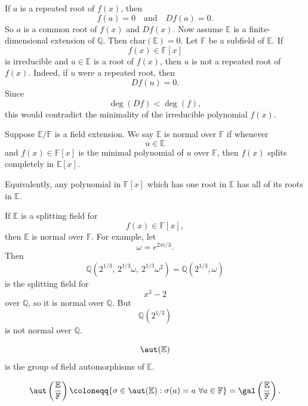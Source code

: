 If $a$ is a repeated root of $f(x)$, then
\[
    f(a)=0
    \quad\text{and}\quad
    Df(a)=0.
\]
So $a$ is a common root of $f(x)$ and $Df(x)$.
Now assume $\mathbb{E}$ is a finite-dimensional extension of $\mathbb{Q}$.
Then $\mathrm{char}(\mathbb{E})=0$.
Let $\mathbb{F}$ be a subfield of $\mathbb{E}$.
If
\[
    f(x)\in \mathbb{F}[x]
\]
is irreducible and $u\in \mathbb{E}$ is a root of $f(x)$, then $u$ is not a repeated root of $f(x)$.
Indeed, if $u$ were a repeated root, then
\[
    Df(u)=0.
\]
Since
\[
    \deg(Df)<\deg(f),
\]
this would contradict the minimality of the irreducible polynomial $f(x)$.

\begin{definition}
    Suppose $\mathbb{E}/\mathbb{F}$ is a field extension.
    We say $\mathbb{E}$ is normal over $\mathbb{F}$ if whenever
    \[
        u\in \mathbb{E}
    \]
    and $f(x)\in \mathbb{F}[x]$ is the minimal polynomial of $u$ over $\mathbb{F}$, then $f(x)$ splits completely in $\mathbb{E}[x]$.
\end{definition}

Equivalently, any polynomial in $\mathbb{F}[x]$ which has one root in $\mathbb{E}$ has all of its roots in $\mathbb{E}$.

\begin{example}
    If $\mathbb{E}$ is a splitting field for
    \[
        f(x)\in \mathbb{F}[x],
    \]
    then $\mathbb{E}$ is normal over $\mathbb{F}$.
    For example, let
    \[
        \omega=e^{2\pi i/3}.
    \]
    Then
    \[
        \mathbb{Q}\left(2^{1/3},\,2^{1/3}\omega,\,2^{1/3}\omega^2\right)
        =
        \mathbb{Q}\left(2^{1/3},\omega\right)
    \]
    is the splitting field for
    \[
        x^3-2
    \]
    over $\mathbb{Q}$, so it is normal over $\mathbb{Q}$.
    But
    \[
        \mathbb{Q}\left(2^{1/3}\right)
    \]
    is not normal over $\mathbb{Q}$.
\end{example}

\begin{definition}[Automorphism]
    \[
        \aut(\mathbb{E})
    \]
    is the group of field automorphisms of $\mathbb{E}$.
\end{definition}

\begin{definition}
    \[
        \aut\left(\frac{\mathbb{E}}{\mathbb{F}}\right)
        \coloneqq
        \{\sigma\in \aut(\mathbb{E}):\sigma(a)=a\ \forall a\in \mathbb{F}\}
        =
        \gal\left(\frac{\mathbb{E}}{\mathbb{F}}\right).
    \]
\end{definition}

